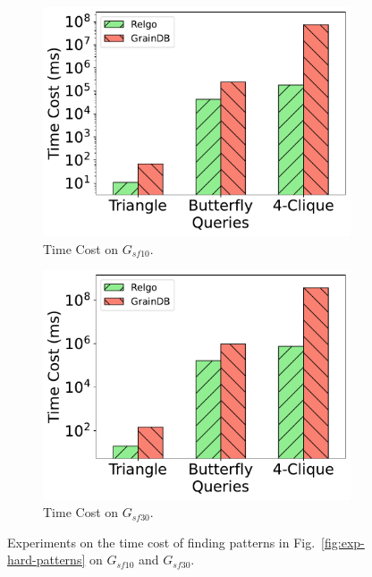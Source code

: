 \begin{figure}[ht]
    \centering
    \begin{subfigure}[b]{.45\linewidth}
        \centering
        \includegraphics[width=\linewidth]{./figures/exp/hard_sf10.pdf}
        \caption{Time Cost on $G_{sf10}$.}
        \label{fig:exp-hard-sf10}
    \end{subfigure}
    \begin{subfigure}[b]{0.45\linewidth}
        \centering
        \includegraphics[width=\linewidth]{./figures/exp/hard_sf30.pdf}
        \caption{Time Cost on $G_{sf30}$.}
        \label{fig:exp-hard-sf30}
    \end{subfigure}
    \caption{Experiments on the time cost of finding patterns in Fig.~\ref{fig:exp-hard-patterns} on $G_{sf10}$ and $G_{sf30}$.}
    \label{fig:exp-hard}
\end{figure}

